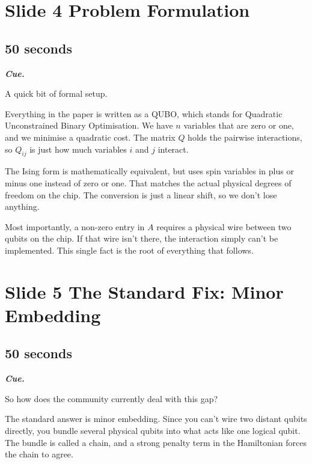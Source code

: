 \documentclass[11pt,a4paper]{article}
\newenvironment{cue}{%
  \par\noindent
  \begin{minipage}{\linewidth}
  \color{muted}\small\itshape
  \textbf{\color{accent}\upshape Cue.}~%
}{%
  \end{minipage}\par\medskip
}
\begin{document}
\section*{Slide 4 \quad Problem Formulation}
\subsection*{50 seconds}

\begin{cue}
A quick bit of formal setup.
\end{cue}

Everything in the paper is written as a QUBO, which stands for Quadratic Unconstrained Binary Optimisation. We have $n$ variables that are zero or one, and we minimise a quadratic cost. The matrix $Q$ holds the pairwise interactions, so $Q_{ij}$ is just how much variables $i$ and $j$ interact.

The Ising form is mathematically equivalent, but uses spin variables in plus or minus one instead of zero or one. That matches the actual physical degrees of freedom on the chip. The conversion is just a linear shift, so we don't lose anything.

Most importantly, a non-zero entry in $A$ requires a physical wire between two qubits on the chip. If that wire isn't there, the interaction simply can't be implemented. This single fact is the root of everything that follows.

\section*{Slide 5 \quad The Standard Fix: Minor Embedding}
\subsection*{50 seconds}

\begin{cue}
So how does the community currently deal with this gap?
\end{cue}

The standard answer is minor embedding. Since you can't wire two distant qubits directly, you bundle several physical qubits into what acts like one logical qubit. The bundle is called a chain, and a strong penalty term in the Hamiltonian forces the chain to agree.
\end{document}
